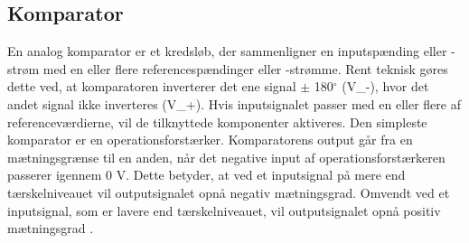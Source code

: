 \subsection{Komparator}\label{Komparatorafsnit}
En analog komparator er et kredsløb, der sammenligner en inputspænding eller -strøm med en eller flere referencespændinger eller -strømme. Rent teknisk gøres dette ved, at komparatoren inverterer det ene signal $\pm$ 180$^{\circ}$ (V_{-}), hvor det andet signal ikke inverteres (V_{+}). Hvis inputsignalet passer med en eller flere af referenceværdierne, vil de tilknyttede komponenter aktiveres. Den simpleste komparator er en operationsforstærker.  
Komparatorens output går fra en mætningsgrænse til en anden, når det negative input af operationsforstærkeren passerer igennem 0 V. Dette betyder, at ved et inputsignal på mere end tærskelniveauet vil outputsignalet opnå negativ mætningsgrad. Omvendt ved et inputsignal, som er lavere end tærskelniveauet, vil outputsignalet opnå positiv mætningsgrad . \cite{webster2009} 

